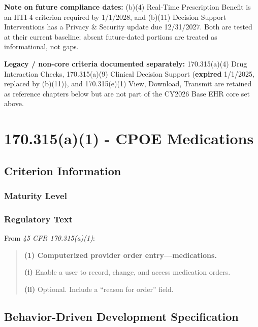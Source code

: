 \textbf{Note on future compliance dates:} (b)(4) Real-Time Prescription Benefit is an HTI-4 criterion required by 1/1/2028, and (b)(11) Decision Support Interventions has a Privacy \& Security update due 12/31/2027. Both are tested at their current baseline; absent future-dated portions are treated as informational, not gaps.

\textbf{Legacy / non-core criteria documented separately:} \textsection{} 170.315(a)(4) Drug Interaction Checks, \textsection{} 170.315(a)(9) Clinical Decision Support (\textbf{expired} 1/1/2025, replaced by (b)(11)), and \textsection{} 170.315(e)(1) View, Download, Transmit are retained as reference chapters below but are not part of the CY2026 Base EHR core set above.

\chapter{\textsection{} 170.315(a)(1) - CPOE Medications}
\label{chap:a1}


\section{Criterion Information}

\subsection{Maturity Level}

\subsection{Regulatory Text}

From \textit{45 CFR \textsection{} 170.315(a)(1)}:

\begin{quotation}
\textbf{(1) Computerized provider order entry---medications.}

\textbf{(i)} Enable a user to record, change, and access medication orders.

\textbf{(ii)} Optional. Include a ``reason for order'' field.
\end{quotation}

\section{Behavior-Driven Development Specification}

